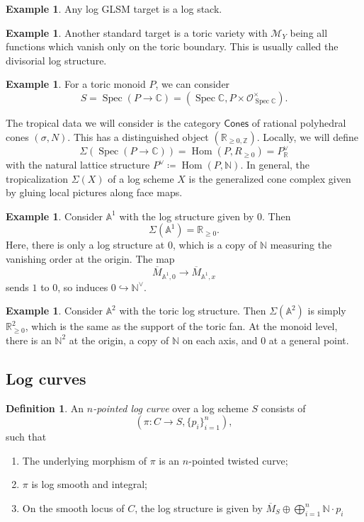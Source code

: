\documentclass[10pt]{amsart}
\theoremstyle{definition}
\newtheorem{defn}[thm]{Definition}
\newtheorem{exm}[thm]{Example}
\theoremstyle{remark}
\theoremstyle{plain}
\theoremstyle{definition}
\theoremstyle{remark}
\newcommand{\A}{\mathbb{A}}
\newcommand{\N}{\mathbb{N}}
\newcommand{\R}{\mathbb{R}}
\newcommand{\C}{\mathbb{C}}
\newcommand{\Z}{\mathbb{Z}}
\newcommand{\mc}[1]{\mathcal{#1}}
\newcommand{\ms}[1]{\mathsf{#1}}
\newcommand{\ol}[1]{\overline{#1}}
\newcommand{\1}{\mathbf{1}}
\newcommand{\2}{\mathbf{2}}
\newcommand{\3}{\mathbf{3}}
\DeclareMathOperator{\Hom}{Hom}
\DeclareMathOperator{\Spec}{Spec}
\begin{document}
\begin{exm}
    Any log GLSM target is a log stack.
\end{exm}

\begin{exm}
    Another standard target is a toric variety with $\mc{M}_Y$ being all functions which vanish only on the toric boundary. This is usually called the divisorial log structure.
\end{exm}

\begin{exm}
    For a toric monoid $P$, we can consider
    \[ S = \Spec(P \to \C) = (\Spec \C, P \times \mc{O}_{\Spec \C}^{\times}). \]
\end{exm}

The tropical data we will consider is the category $\ms{Cones}$ of rational polyhedral cones $(\sigma, N)$. This has a distinguished object $(\R_{\geq 0, \Z})$. Locally, we will define
\[ \Sigma(\Spec (P \to \C)) = \Hom(P, R_{\geq 0}) = P_{\R}^{\vee} \]
with the natural lattice structure $P^{\vee} \coloneqq \Hom(P, \N)$. In general, the tropicalization $\Sigma(X)$ of a log scheme $X$ is the generalized cone complex given by gluing local pictures along face maps.

\begin{exm}
    Consider $\A^1$ with the log structure given by $0$. Then
    \[ \Sigma(\A^1) = \R_{\geq 0}. \]
    Here, there is only a log structure at $0$, which is a copy of $\N$ measuring the vanishing order at the origin. The map
    \[ \ol{M}_{\A^1, 0} \to \ol{M}_{\A^1, x} \]
    sends $1$ to $0$, so induces $0 \hookrightarrow \N^{\vee}$.
\end{exm}

\begin{exm}
    Consider $\A^2$ with the toric log structure. Then $\Sigma(\A^2)$ is simply $\R_{\geq 0}^2$, which is the same as the support of the toric fan. At the monoid level, there is an $\N^2$ at the origin, a copy of $\N$ on each axis, and $0$ at a general point.
\end{exm}

\subsection{Log curves}%
\label{sub:Log curves}

\begin{defn}
    An \textit{$n$-pointed log curve} over a log scheme $S$ consists of
    \[ (\pi \colon C \to S, \{p_i\}_{i=1}^n ), \]
    such that
    \begin{enumerate}
        \item The underlying morphism of $\pi$ is an $n$-pointed twisted curve;
        \item $\pi$ is log smooth and integral;
        \item On the smooth locus of $C$, the log structure is given by $\ol{M}_S \oplus \bigoplus_{i=1}^n \N \cdot p_i$
    \end{enumerate}
\end{defn}
\end{document}
